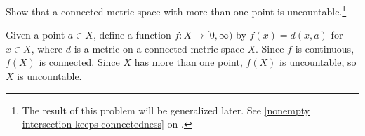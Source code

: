 \begin{prob}\label{Particular uncountable space - connected "metrizable" spaces}
    Show that a connected metric space with more than one point is uncountable.\footnote{The result of this problem will be generalized later. See \cref{nonempty intersection keeps connectedness} on .}
\end{prob}
\begin{sol}
    Given a point $a\in X$, define a function $f: X\rightarrow[0, \infty)$ by $f(x)=d(x, a)$ for $x\in X$, where $d$ is a metric on a connected metric space $X$.
    Since $f$ is continuous, $f(X)$ is connected.
    Since $X$ has more than one point, $f(X)$ is uncountable, so $X$ is uncountable.
\end{sol}